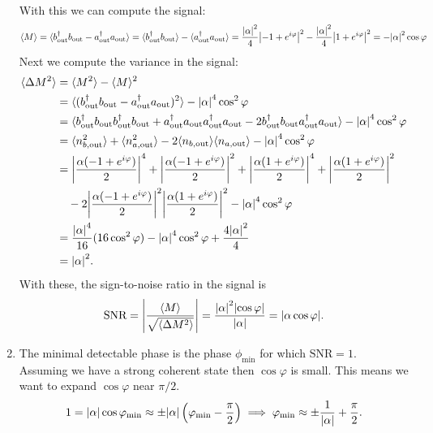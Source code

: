 \documentclass{article}
\theoremstyle{definition}
\newcommand{\al}{\alpha}
\newcommand{\f}[2]{\frac{#1}{#2}}
\newcommand{\lp}{\left(}
\newcommand{\rp}{\right)}
\begin{document}
\begin{enumerate}[label=(\alph*)]
\begin{align*}
\end{align*}
With this we can compute the signal:
\begin{align*}
\langle M \rangle = \langle b_\text{out}^\dagger b_\text{out} - a_\text{out}^\dagger a_\text{out} \rangle 
= \langle b_\text{out}^\dagger b_\text{out} \rangle - \langle a_\text{out}^\dagger a_\text{out} \rangle 
= \f{\abs{\al}^2}{4}\abs{-1+e^{i\varphi}}^2  - \f{\abs{\al}^2}{4} \abs{1+e^{i\varphi}}^2 
= - \abs{\al}^2 \cos\varphi 
\end{align*}
Next we compute the variance in the signal:
\begin{align*}
\langle \Delta M^2 \rangle 
&= \langle M^2\rangle - \langle M \rangle^2\\ 
&= \langle (b_\text{out}^\dagger b_\text{out} - a_\text{out}^\dagger a_\text{out})^2 \rangle - \abs{\al}^4\cos^2\varphi \\ 
&= \langle  b_\text{out}^\dagger b_\text{out} b_\text{out}^\dagger b_\text{out} + 
a_\text{out}^\dagger a_\text{out}a_\text{out}^\dagger a_\text{out}  
- 2 b_\text{out}^\dagger b_\text{out}a_\text{out}^\dagger a_\text{out} \rangle - \abs{\al}^4 \cos^2\varphi\\ 
&= \langle n^2_{b,\text{out}} \rangle + \langle n^2_{a,\text{out}} \rangle 
-2 \langle n_{b,\text{out}} \rangle  \langle n_{a,\text{out}} \rangle - \abs{\al}^4 \cos^2 \varphi \\ 
&= \abs{\f{\al(-1 + e^{i\varphi})}{2}}^4 + \abs{\f{\al(-1 + e^{i\varphi})}{2}}^2 
+ \abs{\f{\al(1+ e^{i\varphi})}{2}}^4 + \abs{\f{\al(1+ e^{i\varphi})}{2}}^2 \\
&\quad - 2 \abs{\f{\al(-1 + e^{i\varphi})}{2}}^2 \abs{ \f{\al(1 + e^{i\varphi})}{2}}^2 
- \abs{\al}^4\cos^2\varphi\\
&= \f{\abs{\al}^4}{16}( 16 \cos^2\varphi  ) - \abs{\al}^4 \cos^2\varphi
+ \f{4\abs{\al}^2}{4}\\
&= \abs{\al}^2.
\end{align*}
With these, the sign-to-noise ratio in the signal is 
\begin{align*}
\text{SNR} = \abs{ \f{\langle M\rangle}{\sqrt{\langle \Delta M^2 \rangle}} }= \f{\abs{\al}^2 \abs{ \cos\varphi}}{\abs{\al}} = \abs{\al \cos\varphi}.
\end{align*}



\item The minimal detectable phase is the phase $\phi_\text{min}$ for which $\text{SNR} = 1$. Assuming we have a strong coherent state then $\cos \varphi$ is small. This means we want to expand $\cos \varphi$ near $\pi/2$.
\begin{align*}
1 = \abs{\al} \cos\varphi_\text{min} \approx  \pm \abs{\al} \lp \varphi_\text{min} - \f{\pi}{2}  \rp \implies \varphi_\text{min} \approx \pm \f{1}{\abs{\al}} + \f{\pi}{2}.
\end{align*}


\end{enumerate}
\end{document}
